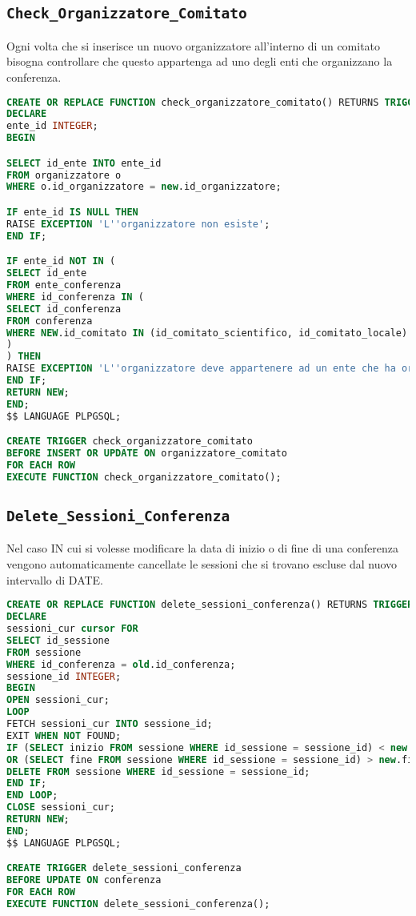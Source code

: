 \subsection{\texttt{Check\_Organizzatore\_Comitato}}
Ogni volta che si inserisce un nuovo organizzatore all'interno di un comitato bisogna controllare che questo appartenga ad uno degli enti che organizzano la conferenza.
\begin{lstlisting}[language=SQL, style=mystyle, caption={\texttt{Check\_organizzatori\_comitato}}]
CREATE OR REPLACE FUNCTION check_organizzatore_comitato() RETURNS TRIGGER AS $$
DECLARE
ente_id INTEGER;
BEGIN

SELECT id_ente INTO ente_id
FROM organizzatore o
WHERE o.id_organizzatore = new.id_organizzatore;

IF ente_id IS NULL THEN
RAISE EXCEPTION 'L''organizzatore non esiste';
END IF;

IF ente_id NOT IN (
SELECT id_ente
FROM ente_conferenza
WHERE id_conferenza IN (
SELECT id_conferenza
FROM conferenza
WHERE NEW.id_comitato IN (id_comitato_scientifico, id_comitato_locale)
)
) THEN
RAISE EXCEPTION 'L''organizzatore deve appartenere ad un ente che ha organizzato la conferenza';
END IF;
RETURN NEW;
END;
$$ LANGUAGE PLPGSQL;

CREATE TRIGGER check_organizzatore_comitato
BEFORE INSERT OR UPDATE ON organizzatore_comitato
FOR EACH ROW
EXECUTE FUNCTION check_organizzatore_comitato();
\end{lstlisting}
\subsection{\texttt{Delete\_Sessioni\_Conferenza}}
Nel caso IN cui si volesse modificare la data di inizio o di fine di una conferenza vengono automaticamente cancellate le sessioni che si trovano escluse dal nuovo intervallo di DATE.
\begin{lstlisting}[language=SQL, style=mystyle, caption={\texttt{DELETE\_sessioni\_conferenza}}]
CREATE OR REPLACE FUNCTION delete_sessioni_conferenza() RETURNS TRIGGER AS $$
DECLARE
sessioni_cur cursor FOR 
SELECT id_sessione 
FROM sessione 
WHERE id_conferenza = old.id_conferenza;
sessione_id INTEGER;
BEGIN
OPEN sessioni_cur;
LOOP
FETCH sessioni_cur INTO sessione_id;
EXIT WHEN NOT FOUND;
IF (SELECT inizio FROM sessione WHERE id_sessione = sessione_id) < new.inizio 
OR (SELECT fine FROM sessione WHERE id_sessione = sessione_id) > new.fine THEN
DELETE FROM sessione WHERE id_sessione = sessione_id;
END IF;
END LOOP;
CLOSE sessioni_cur;
RETURN NEW;
END;
$$ LANGUAGE PLPGSQL;

CREATE TRIGGER delete_sessioni_conferenza
BEFORE UPDATE ON conferenza
FOR EACH ROW
EXECUTE FUNCTION delete_sessioni_conferenza();
\end{lstlisting}
